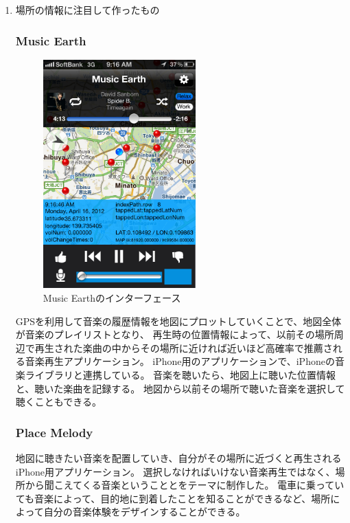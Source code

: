 \documentclass[11pt, onecolumn]{jsarticle}
\begin{document}
\begin{enumerate}
\item
場所の情報に注目して作ったもの

\subsubsection{Music Earth}

\begin{figure}[h]
\begin{center}
\includegraphics[width=5.866cm]{musicEarth.png}
\caption{Music Earthのインターフェース}
\label{musicEarth_interface}
\end{center}
\end{figure}

GPSを利用して音楽の履歴情報を地図にプロットしていくことで、地図全体が音楽のプレイリストとなり、
再生時の位置情報によって、以前その場所周辺で再生された楽曲の中からその場所に近ければ近いほど高確率で推薦される音楽再生アプリケーション。
iPhone用のアプリケーションで、iPhoneの音楽ライブラリと連携している。
音楽を聴いたら、地図上に聴いた位置情報と、聴いた楽曲を記録する。
地図から以前その場所で聴いた音楽を選択して聴くこともできる。
\subsubsection{Place Melody}

地図に聴きたい音楽を配置していき、自分がその場所に近づくと再生されるiPhone用アプリケーション。
選択しなければいけない音楽再生ではなく、場所から聞こえてくる音楽ということとをテーマに制作した。
電車に乗っていても音楽によって、目的地に到着したことを知ることができるなど、場所によって自分の音楽体験をデザインすることができる。


\end{enumerate}
\end{document}
